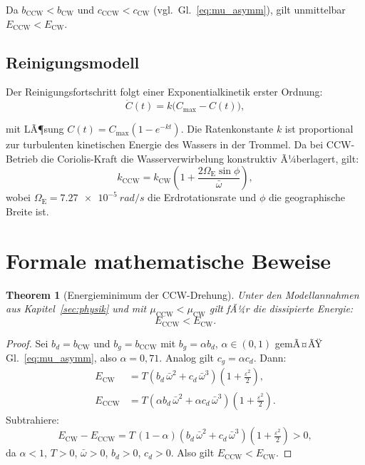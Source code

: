 ﻿\documentclass[12pt,a4paper]{article}
\newtheorem{theorem}{Theorem}[section]
\theoremstyle{remark}
\newcommand{\CCW}{\mathrm{CCW}}
\newcommand{\CW}{\mathrm{CW}}
\begin{document}
	Da $b_{\CCW} < b_{\CW}$ und $c_{\CCW} < c_{\CW}$ (vgl.~Gl.~\eqref{eq:mu_asymm}),
	gilt unmittelbar $E_{\CCW} < E_{\CW}$.
	
	\subsection{Reinigungsmodell}
	
	Der Reinigungsfortschritt folgt einer Exponentialkinetik erster Ordnung:
	\begin{equation}
		\dot{C}(t) = k\bigl(C_{\max} - C(t)\bigr),
		\label{eq:reinigung_ode}
	\end{equation}
	
	mit LÃ¶sung $C(t) = C_{\max}\!\left(1 - e^{-kt}\right)$.
	Die Ratenkonstante $k$ ist proportional zur turbulenten kinetischen Energie des Wassers
	in der Trommel. Da bei CCW-Betrieb die Coriolis-Kraft die Wasserverwirbelung konstruktiv
	Ã¼berlagert, gilt:
	\begin{equation}
		k_{\CCW} = k_{\CW}\left(1 + \frac{2\Omega_{\mathrm{E}}\sin\phi}{\bar{\omega}}\right),
		\label{eq:k_verhaeltnis}
	\end{equation}
	wobei $\Omega_{\mathrm{E}} = \SI{7.27e-5}{rad/s}$ die Erdrotationsrate und $\phi$ die
	geographische Breite ist.
	
	\section{Formale mathematische Beweise}
	\label{sec:beweise}
	
	\begin{theorem}[Energieminimum der CCW-Drehung]
		\label{thm:energie}
		Unter den Modellannahmen aus Kapitel~\ref{sec:physik} und mit
		$\mu_{\CCW} < \mu_{\CW}$ gilt fÃ¼r die dissipierte Energie:
		\begin{equation}
			E_{\CCW} < E_{\CW}.
		\end{equation}
	\end{theorem}
	
	\begin{proof}
		Sei $b_d = b_{\CW}$ und $b_g = b_{\CCW}$ mit $b_g = \alpha b_d$, $\alpha \in (0,1)$
		gemÃ¤ÃŸ Gl.~\eqref{eq:mu_asymm}, also $\alpha = 0{,}71$.
		Analog gilt $c_g = \alpha c_d$.
		Dann:
		\begin{align}
			E_{\CW}  &= T\left(b_d\,\bar{\omega}^2 + c_d\,\bar{\omega}^3\right)\left(1 + \tfrac{\varepsilon^2}{2}\right),\\
			E_{\CCW} &= T\left(\alpha b_d\,\bar{\omega}^2 + \alpha c_d\,\bar{\omega}^3\right)\left(1 + \tfrac{\varepsilon^2}{2}\right).
		\end{align}
		Subtrahiere:
		\begin{equation}
			E_{\CW} - E_{\CCW} = T\,(1-\alpha)\left(b_d\,\bar{\omega}^2 + c_d\,\bar{\omega}^3\right)\left(1+\tfrac{\varepsilon^2}{2}\right) > 0,
		\end{equation}
		da $\alpha < 1$, $T > 0$, $\bar{\omega} > 0$, $b_d > 0$, $c_d > 0$.
		Also gilt $E_{\CCW} < E_{\CW}$.\hfill
	\end{proof}
	
\end{document}

